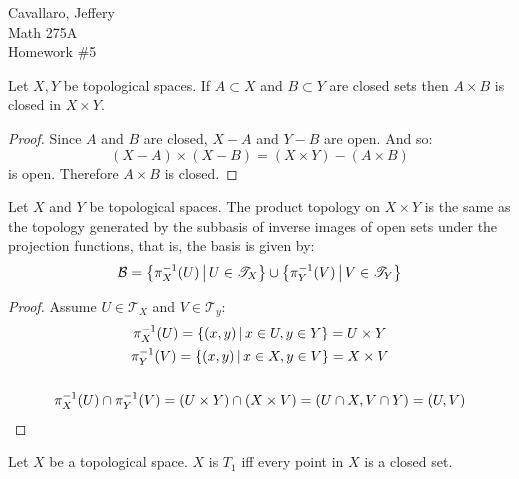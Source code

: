 \documentclass[letterpaper,12pt,fleqn]{article}
\newcommand{\p}{\pi}
\newcommand{\B}{\mathcal{B}}
\newcommand{\T}{\mathscr{T}}
\begin{document}
Cavallaro, Jeffery \\
Math 275A \\
Homework \#5

\bigskip

\begin{theorem}[Exercise 3.34]
  Let \(X,Y\) be topological spaces.  If \(A\subset X\) and \(B\subset Y\) are closed sets then \(A\times B\)
  is closed in \(X\times Y\).
\end{theorem}

\begin{proof}
  Since \(A\) and \(B\) are closed, \(X-A\) and \(Y-B\) are open.  And so:
  \[(X-A)\times(X-B)=(X\times Y)-(A\times B)\]
  is open.  Therefore \(A\times B\) is closed.
\end{proof}

\begin{theorem}[Exercise 3.35]
  Let \(X\) and \(Y\) be topological spaces.  The product topology on \(X\times Y\) is the same as the topology
  generated by the subbasis of inverse images of open sets under the projection functions, that is, the basis is
  given by:
  \[\B=\setb{\p_X^{-1}(U)}{U\in\T_X}\cup\setb{\p_Y^{-1}(V)}{V\in\T_Y}\]
\end{theorem}

\begin{proof}
  Assume \(U\in\T_X\) and \(V\in\T_y\):
  \begin{gather*}
    \p_X^{-1}(U)=\setb{(x,y)}{x\in U,y\in Y}=U\times Y \\
    \p_Y^{-1}(V)=\setb{(x,y)}{x\in X,y\in V}=X\times V \\
    \\
    \p_X^{-1}(U)\cap\p_Y^{-1}(V)=(U\times Y)\cap(X\times V)=(U\cap X,V\cap Y)=(U,V)
  \end{gather*}
\end{proof}

\begin{theorem}[4.1]
  Let \(X\) be a topological space.  \(X\) is \(T_1\) iff every point in \(X\) is a closed set.
\end{theorem}
\end{document}
